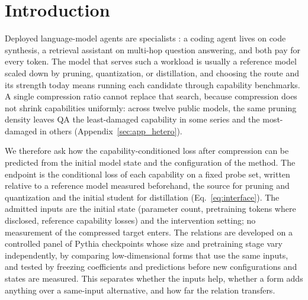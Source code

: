 \section{Introduction}
\label{sec:intro}

Deployed language-model agents are specialists
\citep{yao2023react,schick2023toolformer,jimenez2024swebench,liu2024agentbench}:
a coding agent lives on code synthesis, a retrieval assistant on
multi-hop question answering, and both pay for every token. The model that serves such a workload is usually a reference model
scaled down by pruning, quantization, or distillation, and choosing the route and its
strength today means running each candidate through capability
benchmarks. A single compression ratio cannot replace that search, because
compression does not shrink capabilities uniformly: across twelve
public models, the same pruning density leaves QA the least-damaged
capability in some series and the most-damaged in others
(Appendix~\ref{sec:app_hetero}).

We therefore ask how the capability-conditioned loss after compression
can be predicted from the initial model state and the configuration of
the method. The endpoint is the conditional loss of each capability on
a fixed probe set, written relative to a reference model measured beforehand, the
source for pruning and quantization and the initial student for
distillation (Eq.~\ref{eq:interface}). The admitted inputs are the initial state (parameter count,
pretraining tokens where disclosed, reference capability losses) and
the intervention setting; no measurement of the compressed target
enters. The relations are developed on a controlled panel of
Pythia checkpoints whose size and pretraining stage vary
independently, by comparing low-dimensional forms that use the same
inputs, and tested by freezing coefficients and predictions before new
configurations and states are measured. This separates whether the inputs help, whether a form adds anything
over a same-input alternative, and how far the relation transfers.

